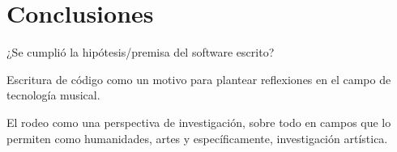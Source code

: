 
\section*{Conclusiones}

¿Se cumplió la hipótesis/premisa del software escrito? 

Escritura de código como un motivo para plantear reflexiones en el campo de tecnología musical. 

El rodeo como una perspectiva de investigación, sobre todo en campos que lo permiten como humanidades, artes y específicamente, investigación artística. 